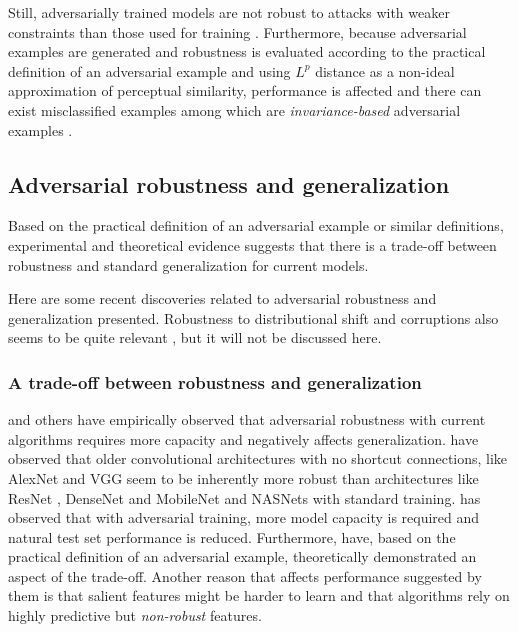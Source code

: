 \documentclass[twocolumn]{article}
\begin{document}
Still, adversarially trained models are not robust to attacks with weaker constraints than those used for training \citep{Schott:2018:TDFARNNMM}. Furthermore, because adversarial examples are generated and robustness is evaluated according to the practical definition of an adversarial example and using $L^p$ distance as a non-ideal approximation of perceptual similarity, performance is affected \citep{Madry:2017:TDLMRAA,Tsipras:2018:RMBOA} and there can exist misclassified examples among which are \textit{invariance-based} adversarial examples \citep{Jacobsen:2019:EEICNBAR}.



\subsection{Adversarial robustness and generalization} \label{sec:robustness-generalization}

Based on the practical definition of an adversarial example or similar definitions, experimental \citep{Madry:2017:TDLMRAA,Su:2018:IRTCOACSRDICM} and theoretical evidence \citep{Tsipras:2018:RMBOA} suggests that there is a trade-off between robustness and standard generalization for current models.

Here are some recent discoveries related to adversarial robustness and generalization presented. Robustness to distributional shift and corruptions also seems to be quite relevant \citep{Gilmer:2019:AENCTEN,Hendrycks:2019:BNNRCCP}, but it will not be discussed here.

\subsubsection{A trade-off between robustness and generalization}

\cite{Madry:2017:TDLMRAA,Su:2017:OPAFDNN,Tsipras:2018:RMBOA} and others have empirically observed that adversarial robustness with current algorithms requires more capacity and negatively affects generalization. \cite{Su:2017:OPAFDNN} have observed that older convolutional architectures with no shortcut connections, like AlexNet \citep{Krizhevsky:2012:ICDCNN} and VGG \citep{Simonyan:2014:VDCNLSIR} seem to be inherently more robust than architectures like ResNet \citep{He:2015:DRLIR}, DenseNet \citep{Huang:2016:DCCN} and MobileNet \citep{Howard:2017:MECNNMVA} and NASNets \citep{Zoph:2018:LTASIR} with standard training. \citet{Madry:2017:TDLMRAA} has observed that with adversarial training, more model capacity is required and natural test set performance is reduced. Furthermore, \citet{Tsipras:2018:RMBOA} have, based on the practical definition of an adversarial example, theoretically demonstrated an aspect of the trade-off. Another reason that affects performance suggested by them is that salient features might be harder to learn and that algorithms rely on highly predictive but \textit{non-robust} features.
\end{document}
